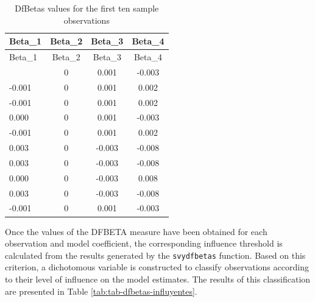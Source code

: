 \documentclass[
  english,
  12pt,
]{book}
\begin{document}
\begin{longtable}[]{@{}lccc@{}}
\caption{\label{tab:tab-dfbetas-primeros}DfBetas values for the first ten sample observations}\tabularnewline
\toprule\noalign{}
Beta\_1 & Beta\_2 & Beta\_3 & Beta\_4 \\
\midrule\noalign{}
\endfirsthead
\toprule\noalign{}
Beta\_1 & Beta\_2 & Beta\_3 & Beta\_4 \\
\midrule\noalign{}
\endhead
\bottomrule\noalign{}
\endlastfoot
0.000 & 0 & 0.001 & -0.003 \\
-0.001 & 0 & 0.001 & 0.002 \\
-0.001 & 0 & 0.001 & 0.002 \\
0.000 & 0 & 0.001 & -0.003 \\
-0.001 & 0 & 0.001 & 0.002 \\
0.003 & 0 & -0.003 & -0.008 \\
0.003 & 0 & -0.003 & -0.008 \\
0.000 & 0 & -0.003 & 0.008 \\
0.003 & 0 & -0.003 & -0.008 \\
-0.001 & 0 & 0.001 & -0.003 \\
\end{longtable}

Once the values of the DFBETA measure have been obtained for each observation and model coefficient, the corresponding influence threshold is calculated from the results generated by the \texttt{svydfbetas} function. Based on this criterion, a dichotomous variable is constructed to classify observations according to their level of influence on the model estimates. The results of this classification are presented in Table \ref{tab:tab-dfbetas-influyentes}.
\end{document}
